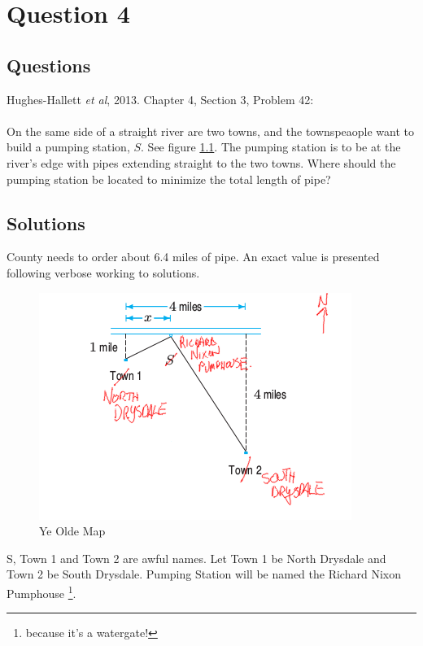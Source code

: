 \chapter{Question 4}
\section{Questions}
Hughes-Hallett \emph{et al}, 2013. Chapter 4, Section 3, Problem 42: \\
\\
\noindent On the same side of a straight river are two towns, and the
townspeaople want to build a pumping station, $S$. See figure \ref{fig:q4_map}.
The pumping station is to be at the river's edge with pipes extending straight
to the two towns. Where should the pumping station be located to minimize the
total length of pipe?

\section{Solutions}
County needs to order about 6.4 miles of pipe. An exact value is presented
following verbose working to solutions.
\begin{figure}[!h]
  \includegraphics[width=\linewidth]{solutions/q4/map.png}
  \caption{Ye Olde Map}
  \label{fig:q4_map}
\end{figure}
S, Town 1 and Town 2 are awful names. Let Town 1 be North Drysdale and Town 2 be
South Drysdale. Pumping Station will be named the Richard Nixon Pumphouse
\footnote{because it's a watergate!}.\\

